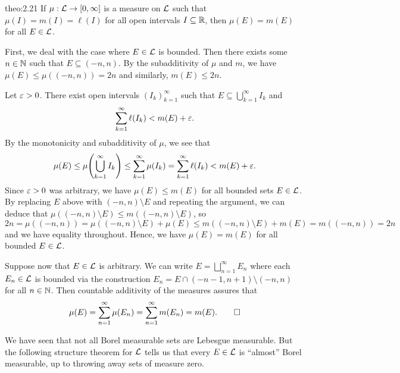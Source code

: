 \begin{theo}{theo:2.21}
    If $\mu : {\cal L} \to [0, \infty]$ is a measure on ${\cal L}$ such that 
    $\mu(I) = m(I) = \ell(I)$ for all open intervals $I \subseteq \mathbb{R}$, then 
    $\mu(E) = m(E)$ for all $E \in {\cal L}$. 
\end{theo}
\begin{pf}
    First, we deal with the case where $E \in {\cal L}$ is bounded. Then 
    there exists some $n \in \mathbb{N}$ such that $E \subseteq (-n, n)$. 
    By the subadditivity of $\mu$ and $m$, we have $\mu(E) \leq \mu((-n, n)) 
    = 2n$ and similarly, $m(E) \leq 2n$. 

    Let $\varepsilon > 0$. There exist open intervals $(I_k)_{k=1}^\infty$ such that 
    $E \subseteq \bigcup_{k=1}^\infty I_k$ and 
    \[ \sum_{k=1}^\infty \ell(I_k) < m(E) + \varepsilon. \] 
    By the monotonicity and subadditivity of $\mu$, we see that 
    \[ \mu(E) \leq \mu\!\left( \bigcup_{k=1}^\infty I_k \right) 
    \leq \sum_{k=1}^\infty \mu(I_k) = \sum_{k=1}^\infty \ell(I_k) 
    < m(E) + \varepsilon. \] 
    Since $\varepsilon > 0$ was arbitrary, we have $\mu(E) \leq m(E)$ for all 
    bounded sets $E \in {\cal L}$. By replacing $E$ above 
    with $(-n, n) \setminus E$ and repeating the argument, we can deduce that 
    $\mu((-n, n) \setminus E) \leq m((-n, n) \setminus E)$, so 
    \[ 2n = \mu((-n, n)) = \mu((-n, n) \setminus E) + \mu(E) 
    \leq m((-n, n) \setminus E) + m(E) = m((-n, n)) = 2n \] 
    and we have equality throughout. Hence, we have $\mu(E) = m(E)$ for all 
    bounded $E \in {\cal L}$. 

    Suppose now that $E \in {\cal L}$ is arbitrary. We can write 
    $E = \bigsqcup_{n=1}^\infty E_n$ where each $E_n \in {\cal L}$ is bounded 
    via the construction $E_n = E \cap (-n-1, n+1) \setminus (-n, n)$ for all 
    $n \in \mathbb{N}$. Then countable additivity of the measures assures that 
    \[ \mu(E) = \sum_{n=1}^\infty \mu(E_n) = \sum_{n=1}^\infty m(E_n) = m(E). 
    \qedhere \] 
\end{pf}

We have seen that not all Borel measurable sets are Lebesgue measurable. 
But the following structure theorem for ${\cal L}$ tells us that every 
$E \in {\cal L}$ is ``almost'' Borel measurable, up to throwing away 
sets of measure zero. 

